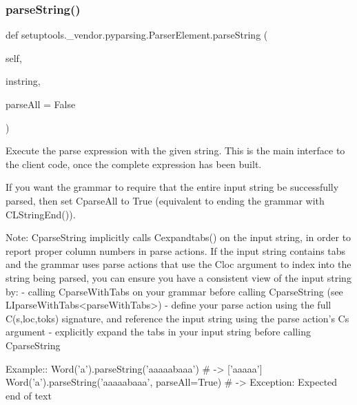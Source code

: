 \subsubsection{\texorpdfstring{parse\+String()}{parseString()}}
{\footnotesize\ttfamily def setuptools.\+\_\+vendor.\+pyparsing.\+Parser\+Element.\+parse\+String (\begin{DoxyParamCaption}\item[{}]{self,  }\item[{}]{instring,  }\item[{}]{parse\+All = {\ttfamily False} }\end{DoxyParamCaption})}

\begin{DoxyVerb}Execute the parse expression with the given string.
This is the main interface to the client code, once the complete
expression has been built.

If you want the grammar to require that the entire input string be
successfully parsed, then set C{parseAll} to True (equivalent to ending
the grammar with C{L{StringEnd()}}).

Note: C{parseString} implicitly calls C{expandtabs()} on the input string,
in order to report proper column numbers in parse actions.
If the input string contains tabs and
the grammar uses parse actions that use the C{loc} argument to index into the
string being parsed, you can ensure you have a consistent view of the input
string by:
 - calling C{parseWithTabs} on your grammar before calling C{parseString}
   (see L{I{parseWithTabs}<parseWithTabs>})
 - define your parse action using the full C{(s,loc,toks)} signature, and
   reference the input string using the parse action's C{s} argument
 - explicitly expand the tabs in your input string before calling
   C{parseString}

Example::
    Word('a').parseString('aaaaabaaa')  # -> ['aaaaa']
    Word('a').parseString('aaaaabaaa', parseAll=True)  # -> Exception: Expected end of text
\end{DoxyVerb}
 \mbox{\label{classsetuptools_1_1__vendor_1_1pyparsing_1_1ParserElement_a6a477b4b208bb35b986767e437994633}} 
